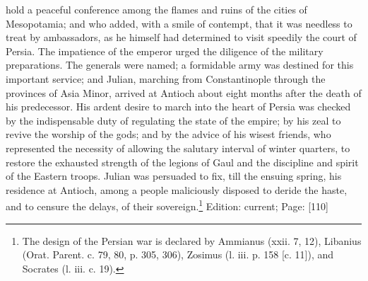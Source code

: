 hold a peaceful conference among the flames and ruins of the cities of Mesopotamia; and who added, with a smile of contempt, that it was needless to treat by ambassadors, as he himself had determined to visit speedily the court of Persia. The impatience of the emperor urged the diligence of the military preparations. The generals were named; a formidable army was destined for this important service; and Julian, marching from Constantinople through the provinces of Asia Minor, arrived at Antioch about eight months after the death of his predecessor. His ardent desire to march into the heart of Persia was checked by the indispensable duty of regulating the state of the empire; by his zeal to revive the worship of the gods; and by the advice of his wisest friends, who represented the necessity of allowing the salutary interval of winter quarters, to restore the exhausted strength of the legions of Gaul and the discipline and spirit of the Eastern troops. Julian was persuaded to fix, till the ensuing spring, his residence at Antioch, among a people maliciously disposed to deride the haste, and to censure the delays, of their sovereign.\footnote{The design of the Persian war is declared by Ammianus (xxii. 7, 12), Libanius (Orat. Parent. c. 79, 80, p. 305, 306), Zosimus (l. iii. p. 158 [c. 11]), and Socrates (l. iii. c. 19).}
Edition: current; Page: [110]

